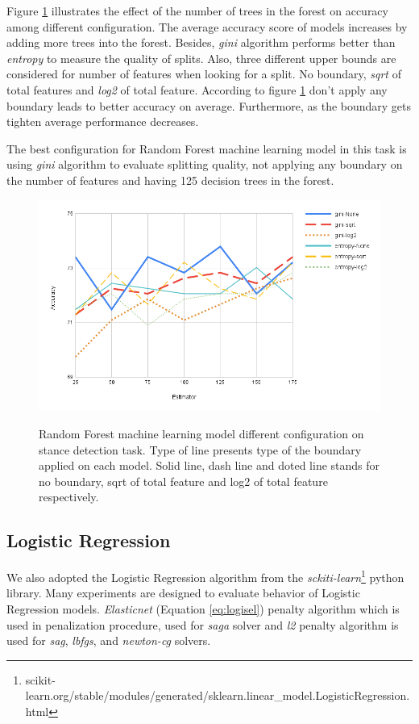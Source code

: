 Figure \ref{fig:randomforest} illustrates the effect of the number of trees in the forest on accuracy among different configuration. The average accuracy score of models increases by adding more trees into the forest. Besides, \textit{gini} algorithm performs better than \textit{entropy} to measure the quality of splits. Also, three different upper bounds are considered for number of features when looking for a split. No boundary, \textit{sqrt} of total features and \textit{log2} of total feature. According to figure \ref{fig:randomforest} don't apply any boundary leads to better accuracy on average. Furthermore, as the boundary gets tighten average performance decreases. 

The best configuration for Random Forest machine learning model in this task is using \textit{gini} algorithm to evaluate splitting quality, not applying any boundary on the number of features and having 125 decision trees in the forest. 
\begin{figure}%
	\centering
	{\includegraphics[width=12.5cm]{statistics/randomforest.png} }
	\caption{Random Forest machine learning model different configuration on stance detection task. Type of line presents type of the boundary applied on each model. Solid line, dash line and doted line stands for no boundary, sqrt of total feature and log2 of total feature respectively.}%
	\label{fig:randomforest}%
\end{figure}
\subsection{Logistic Regression}
We also adopted the Logistic Regression algorithm from the \textit{sckiti-learn}\footnote{scikit-learn.org/stable/modules/generated/sklearn.linear\_model.LogisticRegression.html} python library. Many experiments are designed to evaluate behavior of Logistic Regression models. 	 \textit{Elasticnet} (Equation \ref{eq:logisel}) penalty algorithm which is used in penalization procedure, used for \textit{saga} solver and \textit{l2} penalty algorithm is used for \textit{sag}, \textit{lbfgs}, and \textit{newton-cg} solvers. 

